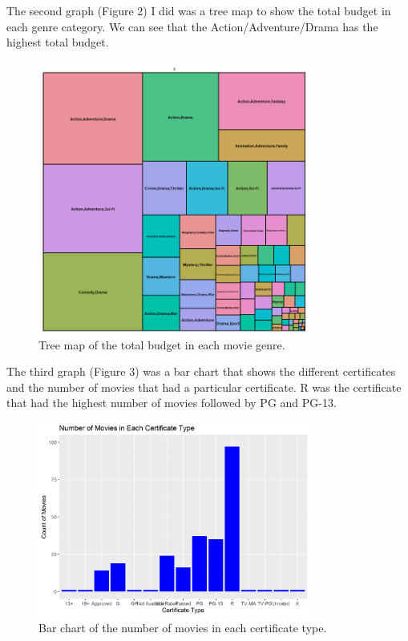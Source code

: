 \documentclass{article}
\begin{document}
The second graph (Figure 2) I did was a tree map to show the total budget in each genre category. We can see that the Action/Adventure/Drama has the highest total budget.
\begin{figure}
\centering
\includegraphics[width=0.8\textwidth]{PS6b_Ouedraogo.png}
\caption{\label{fig:graph2}Tree map of the total budget in each movie genre.}
\end{figure}

The third graph (Figure 3) was a bar chart that shows the different certificates and the number of movies that had a particular certificate. R was the certificate that had the highest number of movies followed by PG and PG-13.
\begin{figure}
\centering
\includegraphics[width=0.8\textwidth]{PS6c_Ouedraogo.png}
\caption{\label{fig:graph3}Bar chart of the number of movies in each certificate type.}
\end{figure}
\end{document}
